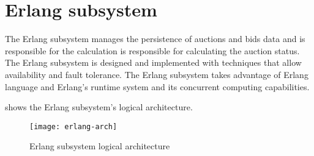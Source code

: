 \section{Erlang subsystem}\label{sec:archerlang}

The Erlang subsystem manages the persistence of auctions and bids data and is
responsible for the calculation is responsible for calculating the auction
status. The Erlang subsystem is designed and implemented with techniques that
allow availability and fault tolerance. The Erlang subsystem takes advantage of
Erlang language and Erlang's runtime system and its concurrent computing
capabilities.

 shows the Erlang subsystem's logical architecture.

\begin{figure}[htb]
	\centering
	\texttt{[image: erlang-arch]}
	\caption{Erlang subsystem logical architecture}\label{fig:erlang-arch}
\end{figure}





